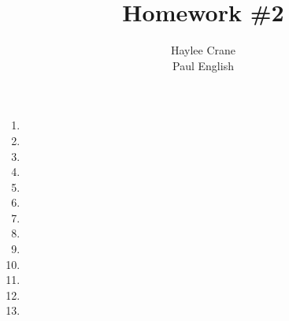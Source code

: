 \documentclass[11pt, oneside]{article}
\title{Homework \#2}
\author{Haylee Crane \\
Paul English}
\begin{document}
\maketitle

\begin{enumerate}

\item 
\item 
\item 
\item 
\item 
\item 
\item 
\item 
\item 
\item 
\item 
\item 
\item 

\end{enumerate}
\end{document}
